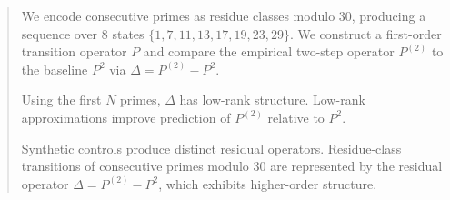 \begin{abstract}
We encode consecutive primes as residue classes modulo $30$, producing a sequence over 8 states $\{1,7,11,13,17,19,23,29\}$. We construct a first-order transition operator $P$ and compare the empirical two-step operator $P^{(2)}$ to the baseline $P^2$ via $\Delta = P^{(2)} - P^2$.

Using the first $N$ primes, $\Delta$ has low-rank structure. Low-rank approximations improve prediction of $P^{(2)}$ relative to $P^2$.

Synthetic controls produce distinct residual operators. Residue-class transitions of consecutive primes modulo $30$ are represented by the residual operator $\Delta = P^{(2)} - P^2$, which exhibits higher-order structure.
\end{abstract}